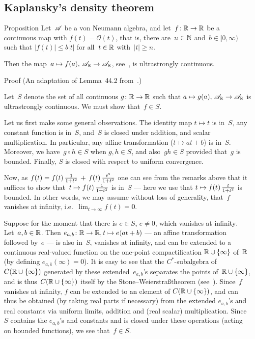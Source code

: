 \documentclass[a]{subfiles}
\begin{document}
\subsection{Kaplansky's density theorem}
\begin{parsec}%
\begin{point}{Proposition}%
Let~$\mathscr{A}$ be a von Neumann algebra,
and let~$f\colon \mathbb{R}\to\mathbb{R}$ be a continuous map 
with $f(t)=\mathcal{O}(t)$,
that is,
there are~$n\in \mathbb{N}$ and~$b\in [0,\infty)$
such that $\left|f(t)\right|\leq b\left|t\right|$
for all~$t\in \mathbb{R}$ with~$\left|t\right| \geq n$.

Then the map~$a\mapsto f(a),\,\mathscr{A}_{\mathbb{R}}\to\mathscr{A}_{\mathbb{R}}$,
see~,
is ultrastrongly continuous.
\begin{point}{Proof}%
(An adaptation of Lemma~44.2 from~\cite{conway2000}.)

Let~$S$ denote the set of all continuous $g\colon \mathbb{R}\to\mathbb{R}$
such that $a\mapsto g(a),\,\mathscr{A}_{\mathbb{R}}\to\mathscr{A}_{\mathbb{R}}$
is ultrastrongly continuous.
We must show that~$f\in S$.

Let us first make some general observations.
The identity map $t\mapsto t$ is in~$S$,
any constant function is in~$S$,
and~$S$ is closed under addition,
and scalar multiplication.
In particular, any affine transformation ($t\mapsto at+b$)
is in~$S$.
Moreover, we have~$g\circ h\in S$ when $g,h\in S$,
and also~$gh\in S$
provided that~$g$ is bounded.
Finally, $S$ is closed with respect to uniform convergence.

Now,
as $f(t)=f(t)\,\smash{\frac{1}{1+t^2}\,+\, f(t)\,\frac{t^2}{1+t^2}}$
 one can see from the remarks above
that it suffices
to show
that~$t\mapsto f(t)\,\smash{\frac{1}{1+t^2}}$ is in~$S$
--- here we use that $t\mapsto f(t) \,\smash{\frac{t}{1+t^2}}$ is bounded.
In other words,
we may assume without loss of generality,
that~$f$ vanishes at infinity, i.e.~$\lim_{t\to \infty}f(t)=0$.

Suppose for the moment
that there is $e\in S$, $e\neq 0$,
which vanishes at infinity.
Let~$a,b\in \mathbb{R}$.
Then $e_{a,b}\colon \mathbb{R}\to\mathbb{R}, t\mapsto e(at+b)$
--- an affine transformation followed by~$e$ ---
is also in~$S$,
vanishes at infinity,
and can be extended to a continuous real-valued
function on the one-point compactification $\mathbb{R}\cup \{ \infty\}$
of~$\mathbb{R}$
(by defining $e_{a,b}(\infty)=0$).
It is easy to see that the $C^*$-subalgebra
of~$C(\mathbb{R}\cup\{\infty\})$
generated by these extended~$e_{a,b}$'s 
separates the points of~$\mathbb{R}\cup\{\infty\}$,
and is thus~$C(\mathbb{R}\cup\{\infty\})$ itself
by the Stone--Weierstra\ss theorem (see~).
Since~$f$ vanishes at infinity,
$f$ can be extended to an element of $C(\mathbb{R}\cup\{\infty\})$,
 and can thus be obtained
(by taking real parts if necessary)
from the extended $e_{a,b}$'s and real constants 
via uniform limits, addition and (real scalar)
multiplication. 
Since~$S$ contains the $e_{a,b}$'s and constants
and is closed under these operations (acting on bounded functions),
we see that~$f\in S$.


\end{point}
\end{point}
\end{parsec}
\end{document}
